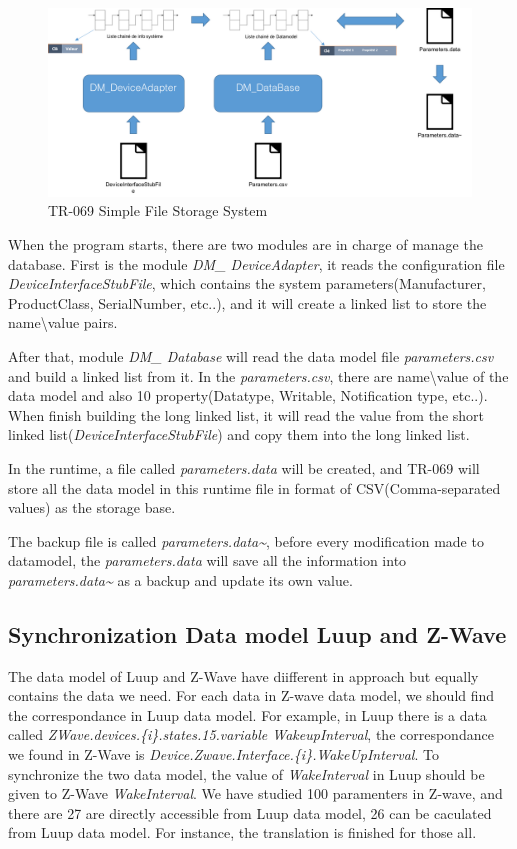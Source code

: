 \begin{figure}[htbp]
	\centering
		\includegraphics[width=14.5cm]{Figures/database}
	\caption[TR-069 Simple File Storage System]{TR-069 Simple File Storage System}
	\label{fig:database}
\end{figure}

When the program starts, there are two modules are in charge of manage the database. First is the module \textit{DM\_ DeviceAdapter}, it reads the configuration file \textit{DeviceInterfaceStubFile}, which contains the system parameters(Manufacturer, ProductClass, SerialNumber, etc..), and it will create a linked list to store the name\textbackslash value pairs.

After that, module \textit{DM\_ Database} will read the data model file \textit{parameters.csv} and build a linked list from it. In the \textit{parameters.csv}, there are name\textbackslash value of the data model and also 10 property(Datatype, Writable, Notification type, etc..). When finish building the long linked list, it will read the value from the short linked list(\textit{DeviceInterfaceStubFile}) and copy them into the long linked list.

In the runtime, a file called \textit{parameters.data} will be created, and TR-069 will store all the data model in this runtime file in format of CSV(Comma-separated values) as the storage base.

The backup file is called \textit{parameters.data\~{}}, before every modification made to datamodel, the \textit{parameters.data} will save all the information into \textit{parameters.data\~{}} as a backup and update its own value.


\subsection{Synchronization Data model Luup and Z-Wave}

The data model of Luup and Z-Wave have diifferent in approach but equally contains the data we need. For each data in Z-wave data model, we should find the correspondance in Luup data model. For example, in Luup there is a data called \textit{ZWave.devices.\{i\}.states.15.variable WakeupInterval}, the correspondance we found in Z-Wave is \textit{Device.Zwave.Interface.\{i\}.WakeUpInterval}. To synchronize the two data model, the value of \textit{WakeInterval} in Luup should be given to Z-Wave \textit{WakeInterval}. We have studied 100 paramenters in Z-wave, and there are 27 are directly accessible from Luup data model, 26 can be caculated from Luup data model. For instance, the translation is finished for those all.
